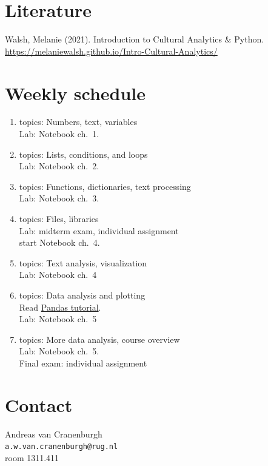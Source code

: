 \documentclass[a4paper,12pt]{article}
\begin{document}
\section{Literature}
Walsh, Melanie (2021). Introduction to Cultural Analytics \& Python.
    \url{https://melaniewalsh.github.io/Intro-Cultural-Analytics/}

\section{Weekly schedule}\label{sectimetable}
\begin{enumerate}
\item topics: Numbers, text, variables \\
    Lab: Notebook ch.\ 1.

\item topics: Lists, conditions, and loops \\
    Lab: Notebook ch.\ 2.

\item topics: Functions, dictionaries, text processing \\
    Lab: Notebook ch.\ 3.

\item topics: Files, libraries \\
    Lab: midterm exam, individual assignment \\
        start Notebook ch.\ 4.

\item topics: Text analysis, visualization \\
    Lab: Notebook ch.\ 4

\item topics: Data analysis and plotting \\
    Read \href{https://www.learndatasci.com/tutorials/python-pandas-tutorial-complete-introduction-for-beginners/}{Pandas tutorial}. \\
    Lab: Notebook ch.\ 5

\item topics: More data analysis, course overview \\
    Lab: Notebook ch.\ 5. \\
    Final exam: individual assignment
\end{enumerate}

\section{Contact}

Andreas van Cranenburgh\\
\texttt{a.w.van.cranenburgh@rug.nl} \\
room 1311.411 \\
\end{document}
